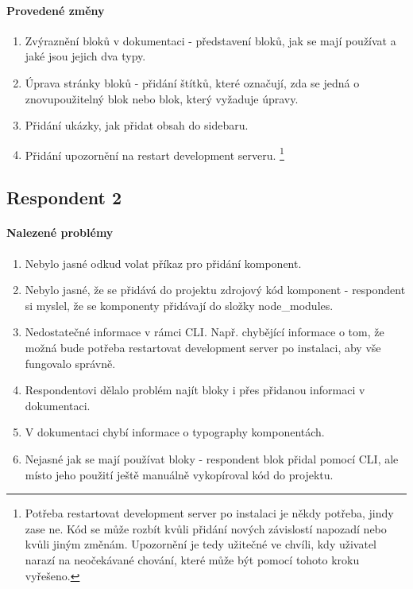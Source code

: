 \paragraph{Provedené změny}
\begin{enumerate}
  \item Zvýraznění bloků v dokumentaci - představení bloků, jak se mají používat a jaké jsou jejich dva typy.
  \item Úprava stránky bloků - přidání štítků, které označují, zda se jedná o znovupoužitelný blok nebo blok, který vyžaduje úpravy.
  \item Přidání ukázky, jak přidat obsah do sidebaru.
  \item Přidání upozornění na restart development serveru. \footnote{Potřeba restartovat development server po instalaci je někdy potřeba, jindy zase ne. Kód se může rozbít kvůli přidání nových závislostí napozadí nebo kvůli jiným změnám. Upozornění je tedy užitečné ve chvíli, kdy uživatel narazí na neočekávané chování, které může být pomocí tohoto kroku vyřešeno.}
\end{enumerate}


\subsection{Respondent 2}

\paragraph{Nalezené problémy}
\begin{enumerate}
  \item Nebylo jasné odkud volat příkaz pro přidání komponent.
  \item Nebylo jasné, že se přidává do projektu zdrojový kód komponent - respondent si myslel, že se komponenty přidávají do složky node\_modules.
  \item Nedostatečné informace v rámci CLI. Např. chybějící informace o tom, že možná bude potřeba restartovat development server po instalaci, aby vše fungovalo správně.
  \item Respondentovi dělalo problém najít bloky i přes přidanou informaci v dokumentaci.
  \item V dokumentaci chybí informace o typography komponentách.
  \item Nejasné jak se mají používat bloky - respondent blok přidal pomocí CLI, ale místo jeho použití ještě manuálně vykopíroval kód do projektu.
\end{enumerate}

